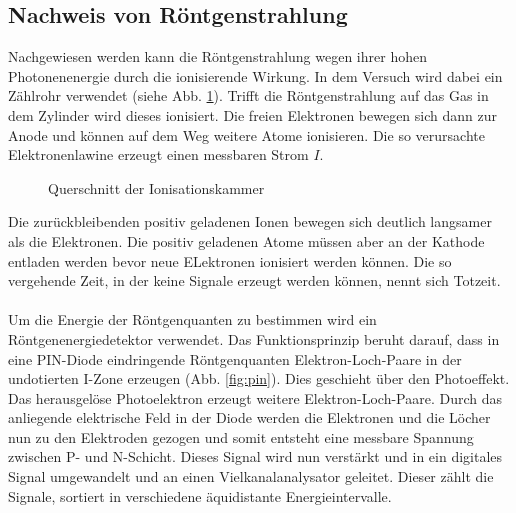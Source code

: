 \subsection{Nachweis von Röntgenstrahlung}

Nachgewiesen werden kann die Röntgenstrahlung wegen ihrer hohen Photonenenergie durch die ionisierende Wirkung. In dem Versuch wird dabei ein Zählrohr \cite{grundlagen} verwendet (siehe Abb. \ref{fig:rohr}). Trifft die Röntgenstrahlung auf das Gas in dem Zylinder wird dieses ionisiert. Die freien Elektronen bewegen sich dann zur Anode und können auf dem Weg weitere Atome ionisieren. Die so verursachte Elektronenlawine erzeugt einen messbaren Strom $I$. 

\begin{figure}[h]
  \centering
  \caption{Querschnitt der Ionisationskammer}
  \label{fig:rohr}
\end{figure}
Die zurückbleibenden positiv geladenen Ionen bewegen sich deutlich langsamer als die Elektronen. Die positiv geladenen Atome müssen aber an der Kathode entladen werden bevor neue ELektronen ionisiert werden können. Die so vergehende Zeit, in der keine Signale erzeugt werden können, nennt sich Totzeit. \\ \\
Um die Energie der Röntgenquanten zu bestimmen wird ein Röntgenenergiedetektor \cite{ld_detektor} verwendet. Das Funktionsprinzip beruht darauf, dass in eine PIN-Diode eindringende Röntgenquanten Elektron-Loch-Paare in der undotierten I-Zone erzeugen (Abb. \ref{fig:pin}). Dies geschieht über den Photoeffekt. Das herausgelöse Photoelektron erzeugt weitere Elektron-Loch-Paare. Durch das anliegende elektrische Feld in der Diode werden die Elektronen und die Löcher nun zu den Elektroden gezogen und somit entsteht eine messbare Spannung zwischen P- und N-Schicht. Dieses Signal wird nun verstärkt und in ein digitales Signal umgewandelt und an einen Vielkanalanalysator geleitet. Dieser zählt die Signale, sortiert in verschiedene äquidistante Energieintervalle.

